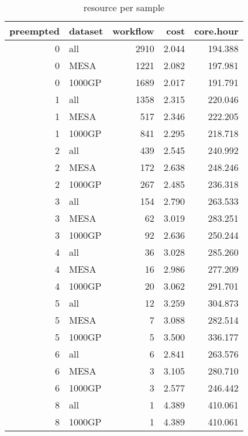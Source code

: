 \begin{table}

\caption{\label{tab:unnamed-chunk-5}resource per sample}
\centering
\begin{tabular}[t]{r|l|r|r|r}
\hline
preempted & dataset & workflow & cost & core.hour\\
\hline
0 & all & 2910 & 2.044 & 194.388\\
\hline
0 & MESA & 1221 & 2.082 & 197.981\\
\hline
0 & 1000GP & 1689 & 2.017 & 191.791\\
\hline
1 & all & 1358 & 2.315 & 220.046\\
\hline
1 & MESA & 517 & 2.346 & 222.205\\
\hline
1 & 1000GP & 841 & 2.295 & 218.718\\
\hline
2 & all & 439 & 2.545 & 240.992\\
\hline
2 & MESA & 172 & 2.638 & 248.246\\
\hline
2 & 1000GP & 267 & 2.485 & 236.318\\
\hline
3 & all & 154 & 2.790 & 263.533\\
\hline
3 & MESA & 62 & 3.019 & 283.251\\
\hline
3 & 1000GP & 92 & 2.636 & 250.244\\
\hline
4 & all & 36 & 3.028 & 285.260\\
\hline
4 & MESA & 16 & 2.986 & 277.209\\
\hline
4 & 1000GP & 20 & 3.062 & 291.701\\
\hline
5 & all & 12 & 3.259 & 304.873\\
\hline
5 & MESA & 7 & 3.088 & 282.514\\
\hline
5 & 1000GP & 5 & 3.500 & 336.177\\
\hline
6 & all & 6 & 2.841 & 263.576\\
\hline
6 & MESA & 3 & 3.105 & 280.710\\
\hline
6 & 1000GP & 3 & 2.577 & 246.442\\
\hline
8 & all & 1 & 4.389 & 410.061\\
\hline
8 & 1000GP & 1 & 4.389 & 410.061\\
\hline
\end{tabular}
\end{table}

